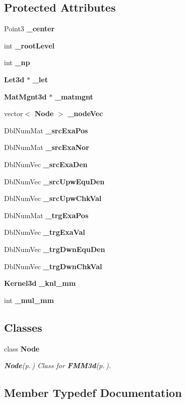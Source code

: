 \subsection*{Protected Attributes}
\begin{CompactItemize}
\item 
Point3 {\bf \_\-center}
\item 
int {\bf \_\-root\-Level}
\item 
int {\bf \_\-np}
\item 
{\bf Let3d} $\ast$ {\bf \_\-let}
\item 
{\bf Mat\-Mgnt3d} $\ast$ {\bf \_\-matmgnt}
\item 
vector$<$ {\bf Node} $>$ {\bf \_\-node\-Vec}
\item 
Dbl\-Num\-Mat {\bf \_\-src\-Exa\-Pos}
\item 
Dbl\-Num\-Mat {\bf \_\-src\-Exa\-Nor}
\item 
Dbl\-Num\-Vec {\bf \_\-src\-Exa\-Den}
\item 
Dbl\-Num\-Vec {\bf \_\-src\-Upw\-Equ\-Den}
\item 
Dbl\-Num\-Vec {\bf \_\-src\-Upw\-Chk\-Val}
\item 
Dbl\-Num\-Mat {\bf \_\-trg\-Exa\-Pos}
\item 
Dbl\-Num\-Vec {\bf \_\-trg\-Exa\-Val}
\item 
Dbl\-Num\-Vec {\bf \_\-trg\-Dwn\-Equ\-Den}
\item 
Dbl\-Num\-Vec {\bf \_\-trg\-Dwn\-Chk\-Val}
\item 
{\bf Kernel3d} {\bf \_\-knl\_\-mm}
\item 
int {\bf \_\-mul\_\-mm}
\end{CompactItemize}
\subsection*{Classes}
\begin{CompactItemize}
\item 
class {\bf Node}
\begin{CompactList}\small\item\em {\bf Node}{\rm (p.\,\pageref{classFMM3d_1_1Node})} Class for {\bf FMM3d}{\rm (p.\,\pageref{classFMM3d})}. \item\end{CompactList}\end{CompactItemize}


\subsection{Member Typedef Documentation}

